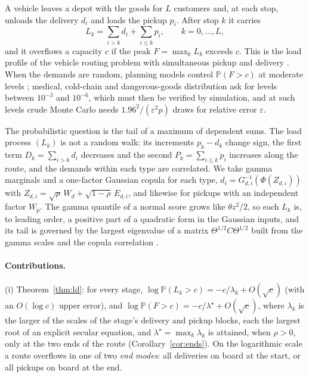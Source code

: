 \documentclass[pdflatex,sn-mathphys-ay]{sn-jnl}%
\theoremstyle{thmstyleone}%
\theoremstyle{thmstylethree}%
\theoremstyle{thmstyletwo}%
\renewcommand{\P}{\mathbb{P}}
\begin{document}
A vehicle leaves a depot with the goods for $L$ customers and, at each stop, unloads
the delivery $d_i$ and loads the pickup $p_i$. After stop $k$ it carries
\[
L_k = \sum_{i>k} d_i + \sum_{i\le k} p_i ,\qquad k=0,\dots,L,
\]
and it overflows a capacity $c$ if the peak $F=\max_k L_k$ exceeds $c$. This is the
load profile of the vehicle routing problem with simultaneous pickup and delivery
\citep{Dethloff2001}. When the demands are random, planning models control
$\P(F>c)$ at moderate levels \citep{GendreauJabaliRei2016,GounarisWiesemannFloudas2013,
DinhFukasawaLuedtke2018,GhosalWiesemann2020}; medical, cold-chain and dangerous-goods
distribution ask for levels between $10^{-3}$ and $10^{-6}$, which must then be verified
by simulation, and at such levels crude Monte Carlo needs $1.96^2/(\varepsilon^2 p)$
draws for relative error $\varepsilon$.

The probabilistic question is the tail of a maximum of dependent sums. The load process
$(L_k)$ is not a random walk: its increments $p_k-d_k$ change sign, the first term
$D_k=\sum_{i>k}d_i$ decreases and the second $P_k=\sum_{i\le k}p_i$ increases along the
route, and the demands within each type are correlated. We take gamma marginals and a
one-factor Gaussian copula for each type, $d_i = G_{d,i}^{-1}(\Phi(Z_{d,i}))$ with
$Z_{d,i}=\sqrt\rho\,W_d+\sqrt{1-\rho}\,E_{d,i}$, and likewise for pickups with an
independent factor $W_p$. The gamma quantile of a normal score grows like
$\theta z^2/2$, so each $L_k$ is, to leading order, a positive part of a quadratic form
in the Gaussian inputs, and its tail is governed by the largest eigenvalue of a matrix
$\Theta^{1/2}C\Theta^{1/2}$ built from the gamma scales and the copula correlation
\citep[the same structure appears in delta--gamma approximations of portfolio losses,][]
{GlassermanHeidelbergerShahabuddin2000}.

\paragraph{Contributions.}
(i) Theorem~\ref{thm:ld}: for every stage,
$\log\P(L_k>c) = -c/\lambda_k + O(\sqrt c)$ (with an $O(\log c)$ upper error), and
$\log\P(F>c) = -c/\lambda^\star + O(\sqrt c)$, where $\lambda_k$ is the larger of the
scales of the stage's delivery and pickup blocks, each the largest root of an explicit
secular equation, and $\lambda^\star = \max_k\lambda_k$ is attained, when $\rho>0$, only
at the two ends of the route (Corollary~\ref{cor:ends}). On the logarithmic scale a route overflows in
one of two \emph{end modes}: all deliveries on board at the start, or all pickups on
board at the end.
\end{document}
